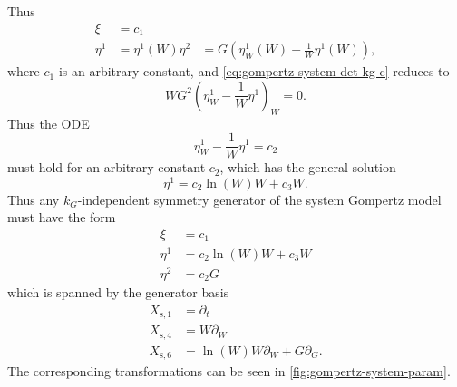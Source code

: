 Thus
\begin{align}
  \xi &= c_1\\
  \eta^1 &= \eta^1(W)
  \eta^2 &= G \left(\eta^1_W(W) - \frac{1}{W} \eta^1(W) \right),
\end{align}
where \(c_1\) is an arbitrary constant, and \cref{eq:gompertz-system-det-kg-c} reduces to
\begin{equation}
  W G^2 \left(\eta^1_W - \frac{1}{W} \eta^1 \right)_W = 0.
\end{equation}
Thus the ODE
\begin{equation}
  \eta^1_W - \frac{1}{W} \eta^1 = c_2
\end{equation}
must hold for an arbitrary constant \(c_2\), which has the general solution
\begin{equation}
  \eta^1 = c_2 \ln(W) W + c_3 W.
\end{equation}
Thus any \(k_G\)-independent symmetry generator of the system Gompertz model  must have the form
\begin{align}
  \xi &= c_1 \\
  \eta^1 &= c_2 \ln(W) W + c_3 W\\
  \eta^2 &= c_2 G
\end{align}
which is spanned by the generator basis
\begin{align}
  X_{\text{s},1} &= \partial_t \\
  X_{\text{s},4} &= W \partial_W \\
  X_{\text{s},6} &= \ln(W) W \partial_W + G \partial_G.
\end{align}
The corresponding transformations can be seen in \cref{fig:gompertz-system-param}.
